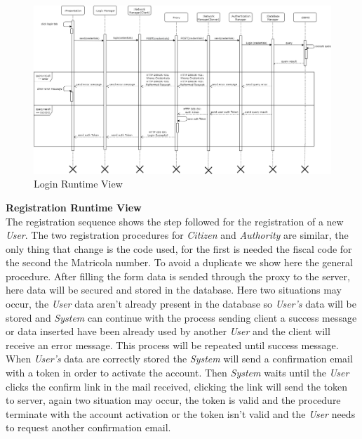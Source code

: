 \documentclass{article}
\begin{document}
\begin{figure}[H]
    \centering
    \includegraphics[scale=0.3]{img/sequence_diagrams/login_sequence.png}
    \caption{Login Runtime View}
\end{figure}  

\clearpage
\textbf{Registration Runtime View}\\
The registration sequence shows the step followed for the 
registration of a new \textit{User}. The two registration procedures for \textit{Citizen} and  
\textit{Authority} are similar, the only thing that change is the code used, for the first is 
needed the fiscal code for the second the Matricola number. To avoid a duplicate we show here 
the general procedure. After filling the form data is sended through the proxy to the server, 
here data will be secured and stored in the database. Here two situations may occur, the \textit{User} 
data aren't already present in the database so \textit{User's} data will be stored and \textit{System} 
can continue with the process sending client a success message or data inserted have been already used 
by another \textit{User} and the client will receive an error message. This process will be repeated 
until success message. When \textit{User's} data are correctly stored the \textit{System} will send a 
confirmation email with a token in order to activate the account. Then \textit{System} waits until the 
\textit{User} clicks the confirm link in the mail received, clicking the link will send the token to 
server, again two situation may occur, the token is valid and the procedure terminate with the account 
activation or the token isn't valid and the \textit{User} needs to request another confirmation email.
\end{document}
